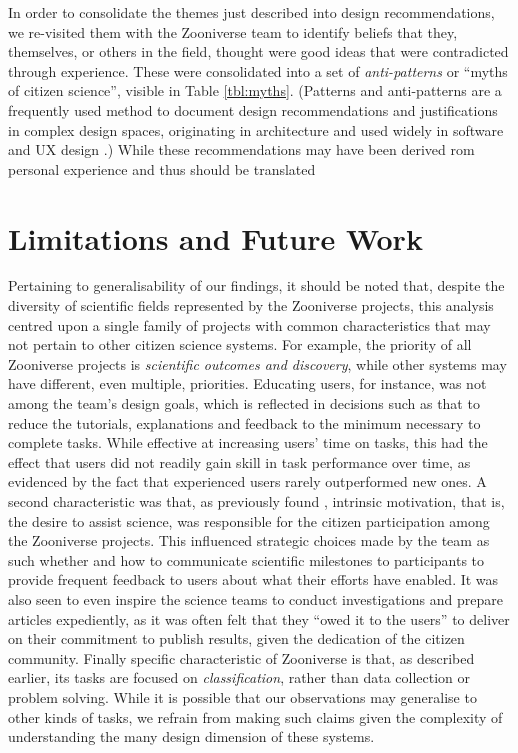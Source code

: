 \documentclass{sigchi}
\begin{document}
In order to consolidate the themes just described into design recommendations, we re-visited them with the Zooniverse team to identify beliefs that they, themselves, or others in the field, thought were good ideas that were contradicted through experience.  These were consolidated into a set of \emph{anti-patterns} or ``myths of citizen science'', visible in Table \ref{tbl:myths}.  (Patterns and anti-patterns are a frequently used method to  document design recommendations and justifications in complex design spaces, originating in architecture and used widely in software and UX design \cite{alexander2006pattern}.)  While these recommendations may have been derived rom personal experience and thus  should be translated

\section{Limitations and Future Work}
Pertaining to generalisability of our findings, it should be noted that, despite the diversity of scientific fields represented by the Zooniverse projects, this analysis centred upon a single family of projects with common characteristics that may not pertain to other citizen science systems.  For example, the priority of all Zooniverse projects is \emph{scientific outcomes and discovery}, while other systems may have different, even multiple, priorities. Educating users, for instance, was not among the team's design goals, which is reflected in decisions such as that to reduce the tutorials, explanations and feedback to the minimum necessary to complete tasks.  While effective at increasing users' time on tasks, this had the effect that users did not readily gain skill in task performance over time, as evidenced by the fact that experienced users rarely outperformed new ones.  A second characteristic was that, as previously found \cite{raddick2010galaxy}, intrinsic motivation, that is, the desire to assist science, was responsible for the citizen participation among the Zooniverse projects.  This influenced strategic choices made by the team as such whether and how to communicate scientific milestones to participants to provide frequent feedback to users about what their efforts have enabled.  It was also seen to even inspire the science teams to conduct investigations and prepare articles expediently, as it was often felt that they ``owed it to the users'' to deliver on their commitment to publish results, given the dedication of the citizen community.  Finally specific characteristic of Zooniverse is that, as described earlier, its tasks are focused on \emph{classification}, rather than data collection or problem solving.  While it is possible that our observations may generalise to other kinds of tasks, we refrain from making such claims given the complexity of understanding the many design dimension of these systems.
\end{document}
